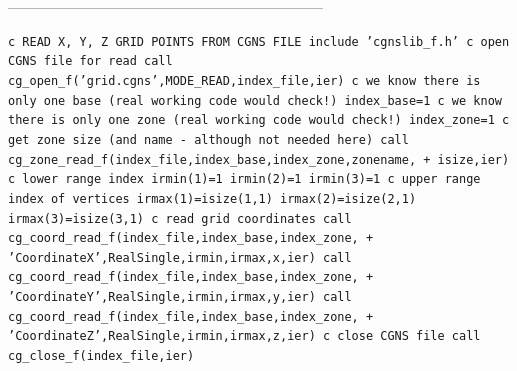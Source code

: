 \documentclass[12pt]{article}
\begin{document}
--------------------------------------------------------------------

{\tt \noindent c  READ X, Y, Z GRID POINTS FROM CGNS FILE
\newline\indent      include 'cgnslib\_f.h'
\newline c   open CGNS file for read
\newline\indent      call cg\_open\_f('grid.cgns',MODE\_READ,index\_file,ier)
\newline c  we know there is only one base (real working code would check!)
\newline\indent      index\_base=1
\newline c  we know there is only one zone (real working code would check!)
\newline\indent      index\_zone=1
\newline c   get zone size (and name - although not needed here)
\newline\indent      call cg\_zone\_read\_f(index\_file,index\_base,index\_zone,zonename,
\newline + \indent isize,ier)
\newline c   lower range index 
\newline\indent      irmin(1)=1
\newline\indent      irmin(2)=1
\newline\indent      irmin(3)=1
\newline c   upper range index of vertices
\newline\indent      irmax(1)=isize(1,1)
\newline\indent      irmax(2)=isize(2,1)
\newline\indent      irmax(3)=isize(3,1)
\newline c   read grid coordinates
\newline\indent      call cg\_coord\_read\_f(index\_file,index\_base,index\_zone,
\newline + \indent 'CoordinateX',RealSingle,irmin,irmax,x,ier)
\newline\indent      call cg\_coord\_read\_f(index\_file,index\_base,index\_zone,
\newline + \indent 'CoordinateY',RealSingle,irmin,irmax,y,ier)
\newline\indent      call cg\_coord\_read\_f(index\_file,index\_base,index\_zone,
\newline + \indent 'CoordinateZ',RealSingle,irmin,irmax,z,ier)
\newline c  close CGNS file
\newline\indent      call cg\_close\_f(index\_file,ier)}
\end{document}
